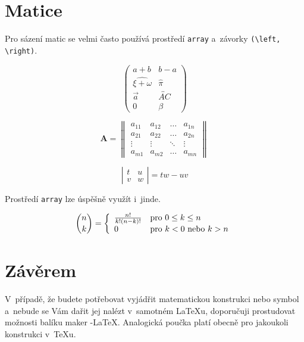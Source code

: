 \documentclass[11pt,a4paper,twocolumn,titlepage]{article}
\begin{document}
\section{Matice}
Pro sázení matic se velmi často používá prostředí \texttt{array} a~závorky \verb|(\left, \right)|.\\
\bigskip

$$ \left( \begin{array}{cc}
a+b & b-a \\
\widehat{\xi + \omega} & \hat{\pi} \\
\vec{a} & \overleftrightarrow{AC} \\
0 & \beta
\end{array} \right) $$

$$\mathbf{A}=\left\|\begin{array}{cccc}
a_{11} & a_{12} & \ldots & a_{1n} \\
a_{21} & a_{22} & \ldots & a_{2n} \\
\vdots & \vdots & \ddots & \vdots \\
a_{m1} & a_{m2} & \ldots & a_{mn}
\end{array}\right\|$$

$$ \left| \begin{array}{cc}
t & u  \\
v & w  
\end{array} \right| = tw - uv $$

Prostředí \texttt{array} lze úspěšně využít i~jinde.

$$\binom{n}{k} = \left\{ 
\begin{array}{l l}
\frac{n!}{k!(n-k)!} & \mbox{pro } 0 \leq k \leq n\\
0 & \mbox{pro $k < 0$ nebo $k > n$}\\
\end{array} \right. $$

\section{Závěrem}
V~případě, že budete potřebovat vyjádřit matematickou konstrukci nebo symbol a~nebude se Vám dařit jej nalézt v~samotném \LaTeX{}u, doporučuji prostudovat možnosti balíku maker \AmS-\LaTeX.
Analogická poučka platí obecně pro jakoukoli konstrukci v~\TeX{}u.
\end{document}
